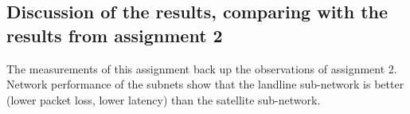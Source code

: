 \documentclass[parskip=full]{scrartcl}
\begin{document}
\subsection{Discussion of the results, comparing with the results from assignment 2}
The measurements of this assignment back up the observations of assignment 2. 
Network performance of the subnets show that the landline sub-network is better (lower packet loss, lower latency) than the satellite sub-network. 

    
    
    
    
    
    
    
    
    
    
    
    
\end{document}
